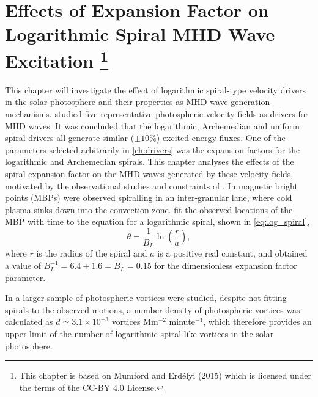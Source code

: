 \documentclass[a4paper,12pt,fourier,authoryear,custommargin]{Classes/PhDThesisPSnPDF}
\begin{document}
\clearpage{}%
%

%
\clearpage{}%

\chapter[Effects of Expansion Factor on Logarithmic Spiral MHD Wave Excitation]{Effects of Expansion Factor on Logarithmic Spiral MHD Wave Excitation \footnote{This chapter is based on Mumford and Erd\'elyi (2015) which is licensed under the terms of the CC-BY 4.0 License.}}\label{ch:expfac}


This chapter will investigate the effect of logarithmic spiral-type velocity drivers in the solar photosphere and their properties as MHD wave generation mechanisms.
 studied five representative photospheric velocity fields as drivers for MHD waves.
It was concluded that the logarithmic, Archemedian and uniform spiral drivers all generate similar ($\pm 10\%$) excited energy fluxes.
One of the parameters selected arbitrarily in \cref{ch:drivers} was the expansion factors for the logarithmic and Archemedian spirals.
This chapter analyses the effects of the spiral expansion factor on the MHD waves generated by these velocity fields, motivated by the observational studies and constraints of \cite{bonet2008}.
In \cite{bonet2008} magnetic bright points (MBPs) were observed spiralling in an inter-granular lane, where cold plasma sinks down into the convection zone.
\cite{bonet2008} fit the observed locations of the MBP with time to the equation for a logarithmic spiral, shown in \cref{eq:log_spiral},
\begin{equation}
\theta = \frac{1}{B_L}\ln\left(\frac{r}{a}\right),
\label{eq:log_spiral}
\end{equation}
\citep{feynman1964} where $r$ is the radius of the spiral and $a$ is a positive real constant, and obtained a value of $B_L^{-1} = 6.4 \pm 1.6 = B_L = 0.15$ for the dimensionless expansion factor parameter.

In \cite{bonet2010} a larger sample of photospheric vortices were studied, despite not fitting spirals to the observed motions, a number density of photospheric vortices was calculated as $d \simeq 3.1 \times 10^{-3}$ vortices Mm$^{-2}$ minute$^{-1}$, which therefore provides an upper limit of the number of logarithmic spiral-like vortices in the solar photosphere.
\end{document}
